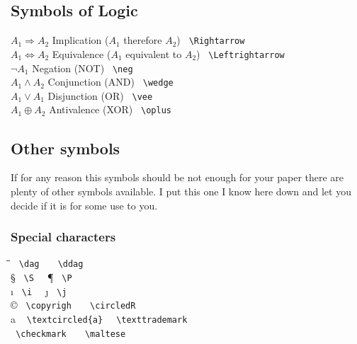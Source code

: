 \subsection{Symbols of Logic}
\begin{tabbing}
\mySymbols
$ A_1 \Rightarrow A_2 $    \>  Implication ($A_1$ therefore $A_2$)     \> \verb` \Rightarrow `  \\
$ A_1 \Leftrightarrow A_2 $\>  Equivalence ($A_1$ equivalent to $A_2$) \> \verb` \Leftrightarrow `  \\
$ \neg A_1 $               \>  Negation (NOT)          \> \verb` \neg `  \\
$ A_1 \wedge A_2 $         \>  Conjunction (AND)       \> \verb` \wedge `  \\
$ A_1 \vee A_1 $           \>  Disjunction (OR)        \> \verb` \vee `  \\
$ A_1 \oplus A_2 $         \>  Antivalence (XOR)       \> \verb` \oplus `  \\
\end{tabbing}

\subsection{Other symbols}
\newcommand{\mySymbolss}{\hspace*{0.1\textwidth}\=\hspace*{0.4\textwidth}\=\hspace*{0.1\textwidth}\=\hspace*{0.3\textwidth}\kill}


If for any reason this symbols should be not enough for your paper there are plenty of other symbols available. I put this one I know here down and let you decide if it is for some use to you.
\subsubsection{Special characters}
\begin{tabbing}
\mySymbolss
\dag   \>  \verb` \dag  ` \> \ddag   \>  \verb` \ddag `  \\
\S   \>  \verb` \S  ` \> \P   \>  \verb` \P `  \\
\i   \>  \verb` \i  ` \> \j  \>  \verb` \j `  \\
\copyright \> \verb` \copyrigh  ` \> \circledR  \>  \verb` \circledR `  \\
\textcircled{a} \> \verb` \textcircled{a} ` \> \texttrademark  \>  \verb` \texttrademark `  \\
\checkmark   \>  \verb` \checkmark  ` \> \maltese  \>  \verb` \maltese `  \\
\end{tabbing}
